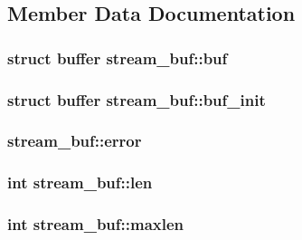 \subsection{Member Data Documentation}
\hypertarget{structstream__buf_a14ba0df037097bc7e378cbe3e0926f92}{}
\subsubsection[{buf}]{\setlength{\rightskip}{0pt plus 5cm}struct {\bf buffer} stream\+\_\+buf\+::buf}\label{structstream__buf_a14ba0df037097bc7e378cbe3e0926f92}
\hypertarget{structstream__buf_addbcd816522dd12dd7736dd746924e40}{}
\subsubsection[{buf\+\_\+init}]{\setlength{\rightskip}{0pt plus 5cm}struct {\bf buffer} stream\+\_\+buf\+::buf\+\_\+init}\label{structstream__buf_addbcd816522dd12dd7736dd746924e40}
\hypertarget{structstream__buf_a27706ecb8f85530569e0d603223c31a0}{}
\subsubsection[{error}]{ stream\+\_\+buf\+::error}\label{structstream__buf_a27706ecb8f85530569e0d603223c31a0}
\hypertarget{structstream__buf_a99b565a42e31b798ba7e0677ce93ddbb}{}
\subsubsection[{len}]{\setlength{\rightskip}{0pt plus 5cm}int stream\+\_\+buf\+::len}\label{structstream__buf_a99b565a42e31b798ba7e0677ce93ddbb}
\hypertarget{structstream__buf_a5f550fd44036c75a09eec163b348f17f}{}
\subsubsection[{maxlen}]{\setlength{\rightskip}{0pt plus 5cm}int stream\+\_\+buf\+::maxlen}\label{structstream__buf_a5f550fd44036c75a09eec163b348f17f}
\hypertarget{structstream__buf_a9ffcabf271af0767607d3282493109f4}{}
